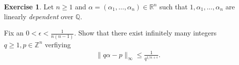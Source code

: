 \documentclass[12pt,a4paper]{article}
\theoremstyle{plain}
\newtheorem*{Sol*}{Solution}
\theoremstyle{definition}
\newtheorem{Ex}{Exercise}
\def \Q {\mathbb Q}
\def \R {\mathbb R}
\def \Z {\mathbb Z}
\newif\ifsolutions
\newcommand{\exercise}[2]{
			\begin{Ex} #1 \end{Ex}
			\ifsolutions  \begin{Sol*} #2 \end{Sol*} \bigskip \else \bigskip  \fi
		}
\begin{document}
\exercise{
	Let $n\geq1$ and $\alpha = (\alpha_1, \dots, \alpha_n) \in \R^n$ such that $1, \alpha_1, \dots, \alpha_n$ are linearly \emph{dependent} over $\Q$.

	Fix an $0 < \epsilon < \frac{1}{n(n-1)}$.
	Show that there exist infinitely many integers $q\geq1, p\in\Z^n$ verfiying
		\begin{gather*}
			 \| q \alpha - p \|_\infty \leq \frac{1}{q^{1/n + \epsilon}}.
		\end{gather*}
}
{
	Denote $\beta = (\alpha_2, \dots, \alpha_n) \in \R^{n-1}$.
	Without loss of generality, we may find an integer vector $v \in \Z^{n-1}$ and an integer $k \geq 1$ such that
		\[ k \alpha_1 = v^T \beta. \]

	We show that, by approximating $\beta$, we may approximate $\alpha_1$ as well.
	Dirichlet's theorem gives infinitely many $\tilde{q} \geq 1, \tilde{p} \in\Z^{n-1}$ such that
		\[ \| \tilde{q} \beta - \tilde{p} \|_\infty \leq \frac{1}{\tilde{q}^{1/(n-1)}}. \]

	Let $q = k \tilde{q}$ and $p = v^T \tilde{p}$. Then
		\[ |q \alpha_1 - p| = |\tilde{q} v^T \beta - v^T \tilde{p}| \leq \frac{\| v \|_1}{\tilde{q}^{1/(n-1)}}. \]
	
	We now note that $\epsilon$ was chosen such that
		\[ \frac{\|v \|_1}{\tilde{q}^{1/(n-1)}} < \frac{1}{q^{1/n + \epsilon}} \]
	as soon as 
		\[ \tilde{q} \geq \left( \| v \|_1 k^{1/n + \epsilon} \right)^{\left( \frac{1}{n(n-1)} - \epsilon \right)^{-1}}, \]
	which must be true for infinitely many $\tilde{q}$.

	In conclusion, defining $p = (p_1, \tilde{p})$ and $q = k \tilde{q}$, we have found infinitely many $q \geq 1, p\in\Z^n$ such that
		\[ \| q \alpha - p \|_\infty \leq \frac{1}{q^{1/n + \epsilon}}. \]


}
\end{document}
